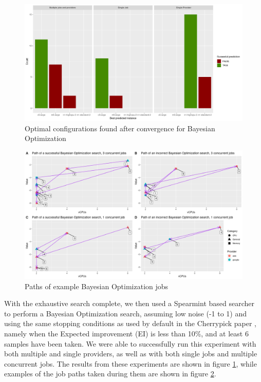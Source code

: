 \documentclass{article}
\begin{document}
\begin{figure}
  \caption{Optimal configurations found after convergence for Bayesian Optimization}
  \label{fig:bo-results}
  \centering
  \includegraphics[scale=0.5]{bo_results}
\end{figure}
\begin{figure}
	\centering
	\includegraphics[scale=0.5]{paths}
	\caption{Paths of example Bayesian Optimization jobs}
	\label{fig:paths}
\end{figure}

With the exhaustive search complete, we then used a Spearmint based searcher to perform a Bayesian Optimization search, assuming low noise (-1 to 1) and using the same stopping conditions as used by default in the Cherrypick paper \cite{Alipourfard2017}, namely when the Expected improvement (EI) is less than 10\%, and at least 6 samples have been taken. We were able to successfully run this experiment with both multiple and single providers, as well as with both single jobs and multiple concurrent jobs. The results from these experiments are shown in figure \ref{fig:bo-results}, while examples of the job paths taken during them are shown in figure \ref{fig:paths}.
\end{document}
